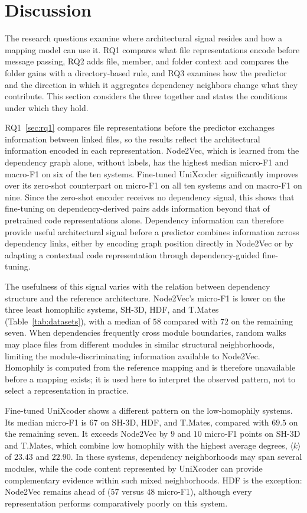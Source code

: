 \section{Discussion\label{sec:discussion}}

The research questions examine where architectural signal resides and how a mapping model can use it. RQ1 compares what file representations encode before message passing, RQ2 adds file, member, and folder context and compares the folder gains with a directory-based rule, and RQ3 examines how the predictor and the direction in which it aggregates dependency neighbors change what they contribute. This section considers the three together and states the conditions under which they hold.

RQ1~\ref{sec:rq1} compares file representations before the predictor exchanges information between linked files, so the results reflect the architectural information encoded in each representation. Node2Vec, which is learned from the dependency graph alone, without labels, has the highest median micro-F1 and macro-F1 on six of the ten systems. Fine-tuned UniXcoder significantly improves over its zero-shot counterpart on micro-F1 on all ten systems and on macro-F1 on nine. Since the zero-shot encoder receives no dependency signal, this shows that fine-tuning on dependency-derived pairs adds information beyond that of pretrained code representations alone. Dependency information can therefore provide useful architectural signal before a predictor combines information across dependency links, either by encoding graph position directly in Node2Vec or by adapting a contextual code representation through dependency-guided fine-tuning.

The usefulness of this signal varies with the relation between dependency structure and the reference architecture. Node2Vec's micro-F1 is lower on the three least homophilic systems, SH-3D, HDF, and T.Mates (Table~\ref{tab:datasets}), with a median of $58$ compared with $72$ on the remaining seven. When dependencies frequently cross module boundaries, random walks may place files from different modules in similar structural neighborhoods, limiting the module-discriminating information available to Node2Vec. Homophily is computed from the reference mapping and is therefore unavailable before a mapping exists; it is used here to interpret the observed pattern, not to select a representation in practice.

Fine-tuned UniXcoder shows a different pattern on the low-homophily systems. Its median micro-F1 is $67$ on SH-3D, HDF, and T.Mates, compared with $69.5$ on the remaining seven. It exceeds Node2Vec by $9$ and $10$ micro-F1 points on SH-3D and T.Mates, which combine low homophily with the highest average degrees, $\langle k \rangle$ of $23.43$ and $22.90$. In these systems, dependency neighborhoods may span several modules, while the code content represented by UniXcoder can provide complementary evidence within such mixed neighborhoods. HDF is the exception: Node2Vec remains ahead of \ft{} ($57$ versus $48$ micro-F1), although every representation performs comparatively poorly on this system.

